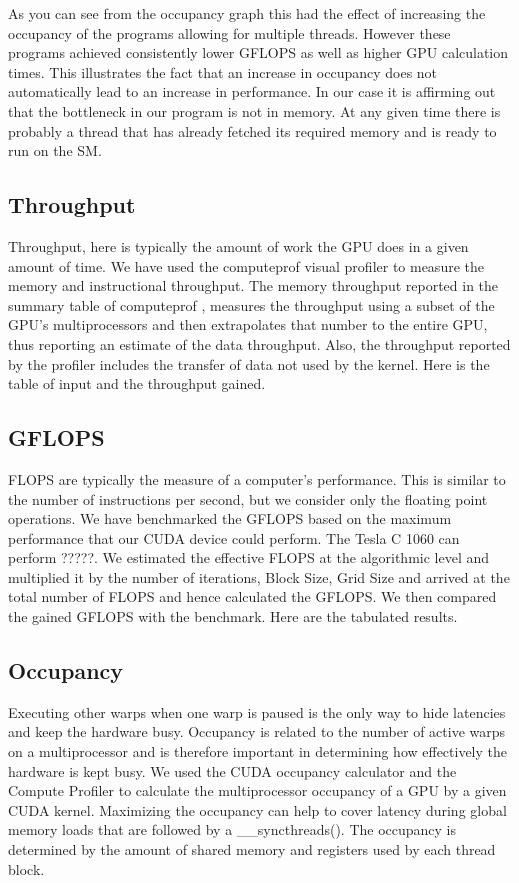 \documentclass[10pt]{article}
\begin{document}
\begin{multicols}{2}
  As you can see from the occupancy graph this had the effect of increasing the occupancy of the programs allowing for multiple threads.
  However these programs achieved consistently lower GFLOPS as well as higher GPU calculation times.
  This illustrates the fact that an increase in occupancy does not automatically lead to an increase in performance.
  In our case it is affirming out that the bottleneck in our program is not in memory.
  At any given time there is probably a thread that has already fetched its required memory and is ready to run on the SM.

  \subsection{Throughput}
  Throughput, here is typically the amount of work the GPU does in a given amount of time.
  We have used the computeprof visual profiler to measure the memory and instructional throughput.
  The memory throughput reported in the summary table of computeprof ,  measures  the throughput using a subset of the GPU’s multiprocessors and then extrapolates that number to the entire GPU, thus reporting an estimate of the data throughput.
  Also, the throughput reported by the profiler includes the transfer of data not used by the kernel.
  Here is the table of input and the throughput gained.

  \subsection{GFLOPS}
  FLOPS are typically the measure of a computer’s performance.
  This is similar to the number of instructions per second, but we consider only the floating point operations.
  We have benchmarked the GFLOPS based on the maximum performance that our CUDA device could perform.
  The Tesla C 1060 can perform ?????.
  We estimated the effective FLOPS at the algorithmic level and multiplied it by the number of iterations, Block Size, Grid Size and arrived at the total number of FLOPS and hence calculated the GFLOPS.
  We then compared the gained GFLOPS with the benchmark.
  Here are the tabulated results.

  \subsection{Occupancy}
  Executing other warps when one warp is paused is the only way to hide latencies and keep the hardware busy.
  Occupancy is related to the number of active warps on a multiprocessor and is therefore important in determining how effectively the hardware is kept busy.
  We used the CUDA occupancy calculator and the Compute Profiler  to calculate the multiprocessor occupancy of a GPU by a given CUDA kernel.
  Maximizing the occupancy can help to cover latency during global memory loads that are followed by a \_\_syncthreads().
  The occupancy is determined by the amount of shared memory and registers used by each thread block.


\end{multicols}
\end{document}
